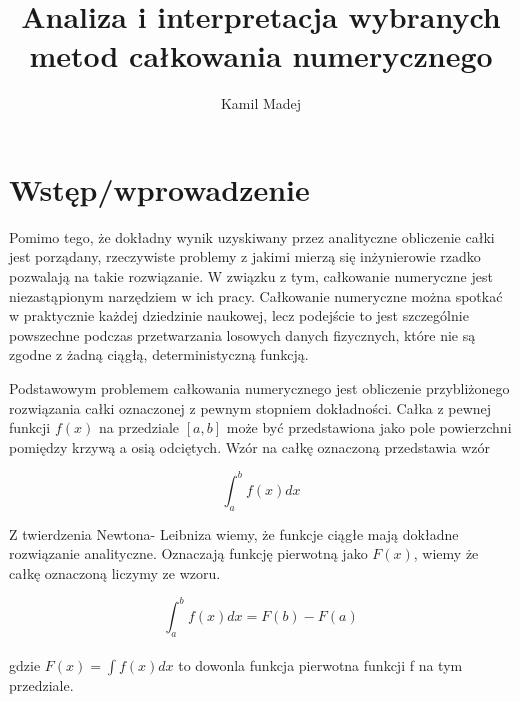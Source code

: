 \documentclass[12pt,twoside]{article}
\author{Kamil Madej}
\title{Analiza i interpretacja wybranych metod całkowania numerycznego}
\begin{document}
\maketitle

\blankpage

\tableofcontents

\clearpage
\blankpage


\section{Wstęp/wprowadzenie}

Pomimo tego, że dokładny wynik uzyskiwany przez analityczne obliczenie całki jest porządany, rzeczywiste problemy z jakimi mierzą się inżynierowie rzadko pozwalają na takie rozwiązanie.
W związku z tym, całkowanie numeryczne jest niezastąpionym narzędziem w ich pracy. Całkowanie numeryczne można spotkać w praktycznie każdej dziedzinie naukowej, lecz podejście to jest szczególnie powszechne podczas przetwarzania losowych danych fizycznych, które nie są zgodne z żadną ciągłą, deterministyczną funkcją.

Podstawowym problemem całkowania numerycznego jest obliczenie przybliżonego rozwiązania całki oznaczonej z pewnym stopniem dokładności.
Całka z pewnej funkcji $f(x)$ na przedziale $[a,b]$ może być przedstawiona jako pole powierzchni pomiędzy krzywą a osią odciętych. 
Wzór na całkę oznaczoną przedstawia wzór

\begin{equation}
\int_a^b f(x) dx
\end{equation}

Z twierdzenia Newtona- Leibniza wiemy, że funkcje ciągłe mają dokładne rozwiązanie analityczne. Oznaczają funkcję pierwotną jako $F(x)$, wiemy że całkę oznaczoną liczymy ze wzoru.

\begin{equation}
\int_a^b f(x)dx = F(b) - F(a)
\end{equation}\\

gdzie $F(x) = \int f(x)dx$ to dowonla funkcja pierwotna funkcji f na tym przedziale.\\
\end{document}
